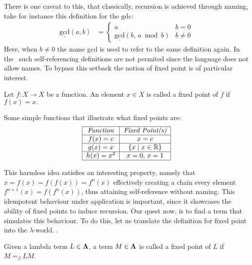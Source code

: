 There is one caveat to this, that classically, recursion is achieved through naming, take for instance this definition for the $\mathrm{gdc}$:
\begin{align*}
  \underline{\mathrm{gcd}}(a,b) &= 
                      \begin{cases}
                        a & b = 0 \\
                        \underline{\mathrm{gcd}}(b,\, a \bmod b) & b \neq 0
                      \end{cases}
\end{align*}
Here, when $b \neq 0$ the name gcd is used to refer to the same definition again. In the \lcalc \ such self-referencing definitions are not permited since the language does not allow names. To bypass this setback the notion of fixed point is of particular interest.
\begin{definition}
  Let \( f : X \to X \) be a function. An element \( x \in X \) is called a fixed point of \( f \) if \( f(x) = x. \)
\end{definition}
\begin{example} Some simple functions that illustrate what fixed points are:
  \[
    \begin{tabular}{|c|c|}
      \hline
      \textit{Function} & \textit{Fixed Point(s)} \\
      \hline
      $f(x) = c$ & $x = c$ \\
      \hline
      $g(x) = x$ & $\{ x \mid x \in \mathbb{R} \}$ \\
      \hline
      $h(x) = x^2$ & $ x = 0,\, x = 1 $ \\
      \hline
    \end{tabular}
  \]
\end{example}
This harmless idea satisfies an interesting property, namely that $ x = f(x) = f(f(x)) = f^n(x) $ effectively creating a chain every element $ f^{n+1}(x) = f(f^{n}(x))$, thus attaining self-reference without naming. This idempotent behaviour under application is important, since it showcases the ability of fixed points to induce recursion. Our quest now, is to find a term that simulates this behaviour. To do this, let us translate the definition for fixed point into the $\lambda$-world.
.
\begin{definition}
  Given a lambda term \( L \in \mathbf{\Lambda} \), a term \( M \in \mathbf{\Lambda} \) is called a fixed point of \( L \) if \( M =_\beta L M \).
\end{definition}
